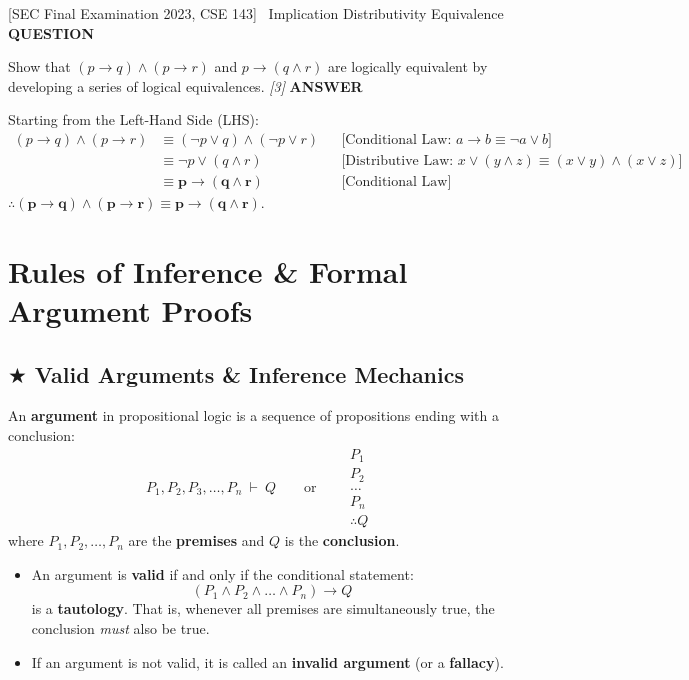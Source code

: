 \documentclass[11pt,a4paper]{article}
\newcommand{\Qlabel}{\textbf{\color{navy}\footnotesize\MakeUppercase{Question}}\par\smallskip}
\newcommand{\Alabel}{\textbf{\color{teal}\footnotesize\MakeUppercase{Answer}}\par\smallskip}
\begin{document}
\begin{exambox}{[SEC Final Examination 2023, CSE 143] \ Implication Distributivity Equivalence}
\Qlabel
Show that $(p \rightarrow q) \wedge (p \rightarrow r)$ and $p \rightarrow (q \wedge r)$ are logically equivalent by developing a series of logical equivalences. \hfill\textit{[3]}
\tcblower
\Alabel
Starting from the Left-Hand Side (LHS):
\begin{align*}
(p \rightarrow q) \wedge (p \rightarrow r) &\equiv (\neg p \vee q) \wedge (\neg p \vee r) && \text{[Conditional Law: } a \to b \equiv \neg a \lor b\text{]} \\
&\equiv \neg p \vee (q \wedge r) && \text{[Distributive Law: } x \lor (y \land z) \equiv (x \lor y) \land (x \lor z)\text{]} \\
&\equiv \mathbf{p \rightarrow (q \wedge r)} && \text{[Conditional Law]}
\end{align*}
$\therefore \mathbf{(p \rightarrow q) \wedge (p \rightarrow r) \equiv p \rightarrow (q \wedge r)}$. \quad [Q.E.D.]
\end{exambox}

\newpage

\section{Rules of Inference \& Formal Argument Proofs}

\subsection{\texorpdfstring{$\bigstar$ }{*}Valid Arguments \& Inference Mechanics}
\begin{defbox}
An \textbf{argument} in propositional logic is a sequence of propositions ending with a conclusion:
\[
P_1, P_2, P_3, \dots, P_n \ \vdash \ Q \qquad \text{or} \qquad 
\begin{array}{l}
P_1 \\ P_2 \\ \dots \\ P_n \\ \hline \therefore Q
\end{array}
\]
where $P_1, P_2, \dots, P_n$ are the \textbf{premises} and $Q$ is the \textbf{conclusion}.
\begin{itemize}
    \item An argument is \textbf{valid} if and only if the conditional statement:
    \[
    (P_1 \wedge P_2 \wedge \dots \wedge P_n) \longrightarrow Q
    \]
    is a \textbf{tautology}. That is, whenever all premises are simultaneously true, the conclusion \textit{must} also be true.
    \item If an argument is not valid, it is called an \textbf{invalid argument} (or a \textbf{fallacy}).
\end{itemize}
\end{defbox}
\end{document}
